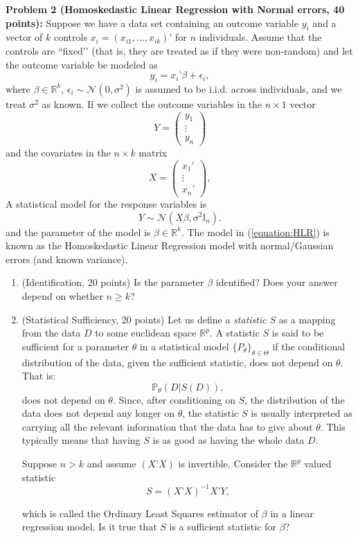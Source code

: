 \documentclass[11pt]{article} %
\begin{document}
\noindent \textbf{Problem 2 (Homoskedastic Linear Regression with Normal errors, 40 points):} Suppose we have a data set containing an outcome variable $y_i$ and a vector of $k$ controls $x_i = (x_{i1},\ldots, x_{ik})’$ for $n$ individuals. Assume that the controls are ``fixed’’ (that is, they are treated as if they were non-random) and let the outcome variable be modeled as
\[ y_i = x_i’ \beta + \epsilon_{i}, \]
where $\beta \in \mathbb{R}^{k}$, $\epsilon_{i} \sim \mathcal{N}(0, \sigma^2)$ is assumed to be i.i.d. across individuals, and we treat $\sigma^2$ as known.  If we collect the outcome variables in the $n \times 1$ vector
\[ 
Y = 
\begin{pmatrix}
y_{1} \\
\vdots \\
y_{n}
\end{pmatrix} 
\]
and the covariates in the $n \times k$ matrix
\[ X =
\begin{pmatrix}
x_1’ \\
\vdots\\
x_n’
\end{pmatrix},
\]
A statistical model for the response variables is
\begin{equation} \label{equation:HLR}
Y \sim \mathcal{N}(X \beta, \sigma^2 \mathbb{I}_n ). 
\end{equation}
and the parameter of the model is $\beta \in \mathbb{R}^{k}$. The model in (\ref{equation:HLR}) is known as the Homoskedastic Linear Regression model with normal/Gaussian errors (and known variance). 

\begin{enumerate}
\item (Identification, 20 points) Is the parameter $\beta$ identified? Does your answer depend on whether $n \geq k$?  

\item (Statistical Sufficiency, 20 points) Let us define a \emph{statistic} $S$ as a mapping from the data $D$ to some euclidean space $\mathbb{R}^{p}$. A statistic $S$ is said to be sufficient for a parameter $\theta$  in a statistical model $\{P_{\theta}\}_{\theta \in \Theta}$ if the conditional distribution of the data, given the sufficient statistic, does not depend on $\theta$. That is:
\[ \mathbb{P}_{\theta} (D | S(D)), \]
does not depend on $\theta$. Since, after conditioning on $S$, the distribution of the data does not depend any longer on $\theta$, the statistic $S$ is usually interpreted as carrying all the relevant information that the data has to give about $\theta$. This typically means that having $S$ is as good as having the whole data $D$. 

Suppose $n > k$ and assume $(X’X)$ is invertible. Consider the $\mathbb{R}^{p}$ valued statistic 
\[ S = (X’X)^{-1} X’ Y, \]

which is called the Ordinary Least Squares estimator of $\beta$ in a linear regression model. Is it true that $S$ is a sufficient statistic for $\beta$?

\end{enumerate}
\end{document}
